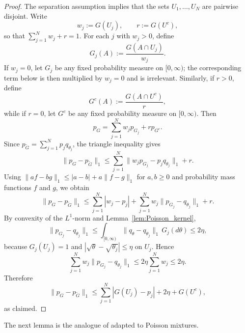 \documentclass[twoside,12pt]{article}
\begin{document}
\begin{proof}
The separation assumption implies that the sets $U_1,\dots,U_N$ are pairwise disjoint. Write
\begin{displaymath}
w_j:=G(U_j),\qquad r:=G(U^c),
\end{displaymath}
so that $\sum_{j=1}^N w_j+r=1$. For each $j$ with $w_j>0$, define
\begin{displaymath}
G_j(A):=\frac{G(A\cap U_j)}{w_j}.
\end{displaymath}
If $w_j=0$, let $G_j$ be any fixed probability measure on $[0,\infty)$; the corresponding term below is then multiplied by $w_j=0$ and is irrelevant. Similarly, if $r>0$, define
\begin{displaymath}
G^c(A):=\frac{G(A\cap U^c)}{r},
\end{displaymath}
while if $r=0$, let $G^c$ be any fixed probability measure on $[0,\infty)$. Then
\begin{displaymath}
p_G=\sum_{j=1}^N w_j p_{G_j}+r p_{G^c}.
\end{displaymath}
Since $p_{\tilde G}=\sum_{j=1}^N p_j q_{\theta_j}$, the triangle inequality gives
\begin{displaymath}
\|p_G-p_{\tilde G}\|_1\le\sum_{j=1}^N \|w_jp_{G_j}-p_jq_{\theta_j}\|_1+r.
\end{displaymath}
Using $\|af-bg\|_1\le|a-b|+a\|f-g\|_1$ for $a,b\ge 0$ and probability mass functions $f$ and $g$, we obtain
\begin{displaymath}
\|p_G-p_{\tilde G}\|_1\le\sum_{j=1}^N |w_j-p_j|+\sum_{j=1}^N w_j\|p_{G_j}-q_{\theta_j}\|_1+r.
\end{displaymath}
By convexity of the $L^1$-norm and Lemma~\ref{lem:Poisson_kernel},
\begin{displaymath}
\|p_{G_j}-q_{\theta_j}\|_1\le\int_{[0,\infty)} \|q_\theta-q_{\theta_j}\|_1\,G_j(d\theta)\le2\eta,
\end{displaymath}
because $G_j(U_j)=1$ and $|\sqrt{\theta}-\sqrt{\theta_j}|\le\eta$ on $U_j$. Hence
\begin{displaymath}
\sum_{j=1}^N w_j\|p_{G_j}-q_{\theta_j}\|_1\le2\eta\sum_{j=1}^N w_j\le2\eta.
\end{displaymath}
Therefore
\begin{displaymath}
\|p_G-p_{\tilde G}\|_1\le\sum_{j=1}^N |G(U_j)-p_j|+2\eta+G(U^c),
\end{displaymath}
as claimed.
\end{proof}

The next lemma is the analogue of \citet[Lemma 4.1]{Gho(01)} adapted to Poisson mixtures.
\end{document}

